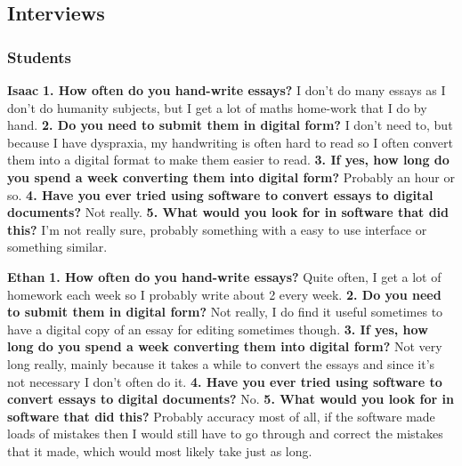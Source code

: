 \documentclass{report}
\begin{document}
\subsection{Interviews}


\subsubsection{Students}
\textbf{Isaac}
\newline
\textbf{1. How often do you hand-write essays?}
\newline
I don't do many essays as I don't do humanity subjects, but I get a lot of maths home-work that I do by hand.
\newline
\textbf{2. Do you need to submit them in digital form?}
\newline
I don't need to, but because I have dyspraxia, my handwriting is often hard to read so I often convert them into a digital format to make them easier to read.
\newline
\textbf{3. If yes, how long do you spend a week converting them into digital form?}
\newline
Probably an hour or so.
\newline
\textbf{4. Have you ever tried using software to convert essays to digital documents?}
\newline
Not really.
\newline
\textbf{5. What would you look for in software that did this?}
\newline
I'm not really sure, probably something with a easy to use interface or something similar.
\newline

\noindent\textbf{Ethan}
\newline
\textbf{1. How often do you hand-write essays?}
\newline
Quite often, I get a lot of homework each week so I probably write about 2 every week.
\newline
\textbf{2. Do you need to submit them in digital form?}
\newline
Not really, I do find it useful sometimes to have a digital copy of an essay for editing sometimes though.
\newline
\textbf{3. If yes, how long do you spend a week converting them into digital form?}
\newline
Not very long really, mainly because it takes a while to convert the essays and since it's not necessary I don't often do it.
\newline
\textbf{4. Have you ever tried using software to convert essays to digital documents?}
\newline
No.
\newline
\textbf{5. What would you look for in software that did this?}
\newline
Probably accuracy most of all, if the software made loads of mistakes then I would still have to go through and correct the mistakes that it made, which would most likely take just as long.
\newline
\end{document}

